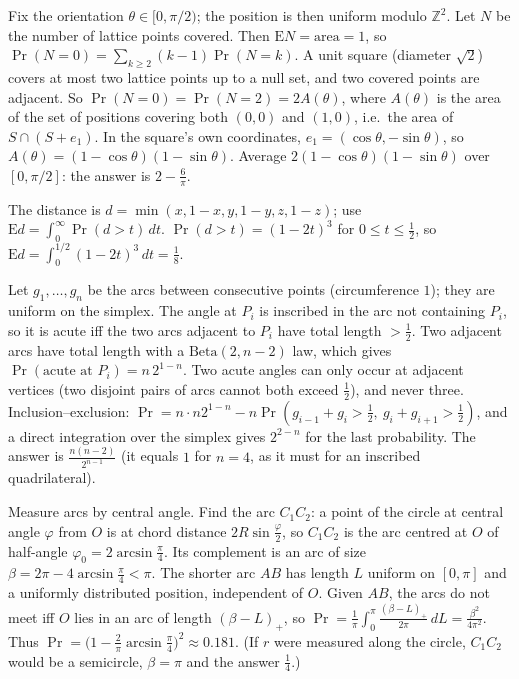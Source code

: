 \documentclass[11pt,a4paper]{article}
\begin{document}

 Fix the orientation $\theta\in[0,\pi/2)$; the position is then uniform modulo $\mathbb Z^2$. Let $N$ be the number of lattice points covered. Then $\mathrm E N=\text{area}=1$, so $\Pr(N=0)=\sum_{k\ge2}(k-1)\Pr(N=k)$.
 A unit square (diameter $\sqrt2$) covers at most two lattice points up to a null set, and two covered points are adjacent. So $\Pr(N=0)=\Pr(N=2)=2A(\theta)$, where $A(\theta)$ is the area of the set of positions covering both $(0,0)$ and $(1,0)$, i.e.\ the area of $S\cap(S+e_1)$.
 In the square's own coordinates, $e_1=(\cos\theta,-\sin\theta)$, so $A(\theta)=(1-\cos\theta)(1-\sin\theta)$. Average $2(1-\cos\theta)(1-\sin\theta)$ over $[0,\pi/2]$: the answer is $2-\frac6\pi$.

 The distance is $d=\min(x,1-x,y,1-y,z,1-z)$; use $\mathrm Ed=\int_0^\infty\Pr(d>t)\,dt$.
 $\Pr(d>t)=(1-2t)^3$ for $0\le t\le\frac12$, so $\mathrm E d=\int_0^{1/2}(1-2t)^3\,dt=\frac18$.

 Let $g_1,\dots,g_n$ be the arcs between consecutive points (circumference $1$); they are uniform on the simplex. The angle at $P_i$ is inscribed in the arc not containing $P_i$, so it is acute iff the two arcs adjacent to $P_i$ have total length $>\frac12$.
 Two adjacent arcs have total length with a $\mathrm{Beta}(2,n-2)$ law, which gives $\Pr(\text{acute at }P_i)=n\,2^{1-n}$. Two acute angles can only occur at adjacent vertices (two disjoint pairs of arcs cannot both exceed $\frac12$), and never three.
 Inclusion--exclusion: $\Pr=n\cdot n2^{1-n}-n\Pr(g_{i-1}+g_i>\frac12,\ g_i+g_{i+1}>\frac12)$, and a direct integration over the simplex gives $2^{2-n}$ for the last probability. The answer is $\frac{n(n-2)}{2^{n-1}}$ (it equals $1$ for $n=4$, as it must for an inscribed quadrilateral).

 Measure arcs by central angle. Find the arc $C_1C_2$: a point of the circle at central angle $\varphi$ from $O$ is at chord distance $2R\sin\frac\varphi2$, so $C_1C_2$ is the arc centred at $O$ of half-angle $\varphi_0=2\arcsin\frac\pi4$. Its complement is an arc of size $\beta=2\pi-4\arcsin\frac\pi4<\pi$.
 The shorter arc $AB$ has length $L$ uniform on $[0,\pi]$ and a uniformly distributed position, independent of $O$. Given $AB$, the arcs do not meet iff $O$ lies in an arc of length $(\beta-L)_+$, so $\Pr=\frac1\pi\int_0^\pi\frac{(\beta-L)_+}{2\pi}\,dL=\frac{\beta^2}{4\pi^2}$.
 Thus $\Pr=\big(1-\frac2\pi\arcsin\frac\pi4\big)^2\approx0.181$. (If $r$ were measured along the circle, $C_1C_2$ would be a semicircle, $\beta=\pi$ and the answer $\frac14$.)
\end{document}
